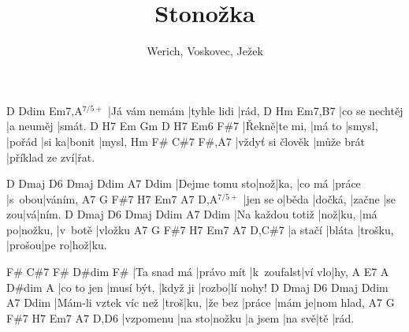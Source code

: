 \documentclass{song}
\title{Stonožka}
\author{Werich, Voskovec, Ježek}
\newcommand{\aug}{$^{7/5+}$}
\begin{document}
\strophe
D             Ddim        Em7,A\aug
|Já vám nemám |tyhle lidi |rád,
D              Hm        Em7,B7
|co se nechtěj |a neuměj |smát.
D     H7      Em     Gm      D      H7    Em6    F\#7
|Řekně|te mi, |má to |smysl, |pořád |si ka|bonit |mysl,
Hm               F\#        C\#7           F\#,A7
|vždyť si člověk |může brát |příklad ze zví|řat.
\endstrophe

\strophe
D              Dmaj D6  Dmaj   Ddim   A7     Ddim
|Dejme tomu sto|nož|ka, |co má |práce |s~obou|váním,
A7       G     F\#7    H7     Em7    A7 D,A\aug
|jen se o|běda |dočká, |začne |se zou|vá|ním.
D                Dmaj D6  Dmaj  Ddim    A7      Ddim
|Na každou totiž |nož|ku, |má po|nožku, |v~botě |vložku
A7       G      F\#7     H7     Em7   A7  D,C\#7
|a stačí |bláta |trošku, |prošou|pe ro|hož|ku.
\endstrophe

\strophe
F\#         C\#7       F\#        D\#dim F\#
|Ta snad má |právo mít |k~zoufalst|ví vlo|hy,
A          E7         A        D\#dim A
|co to jen |musí být, |když ji |rozbo|lí nohy!
D                     Dmaj D6   Dmaj    Ddim   A7     Ddim
|Mám-li vztek víc než |troš|ku, |že bez |práce |mám je|nom hlad,
A7        G      F\#7   H7      Em7    A7  D,D6
|vzpomenu |na sto|nožku |a jsem |na svě|tě |rád.
\endstrophe

\end{document}
